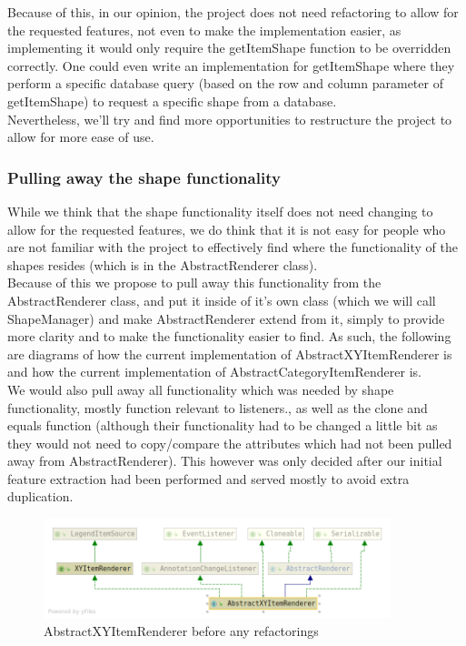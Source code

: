\documentclass{article}
\begin{document}
Because of this, in our opinion, the project does not need refactoring to allow for the requested features, not even to make the implementation easier, as implementing it would only require the getItemShape function to be overridden correctly. One could even write an implementation for getItemShape where they perform a specific database query (based on the row and column parameter of getItemShape) to request a specific shape from a database.\\

Nevertheless, we'll try and find more opportunities to restructure the project to allow for more ease of use.

\subsubsection{Pulling away the shape functionality}

While we think that the shape functionality itself does not need changing to allow for the requested features, we do think that it is not easy for people who are not familiar with the project to effectively find where the functionality of the shapes resides (which is in the AbstractRenderer class).\\

Because of this we propose to pull away this functionality from the AbstractRenderer class, and put it inside of it's own class (which we will call ShapeManager) and make AbstractRenderer extend from it, simply to provide more clarity and to make the functionality easier to find. As such, the following are diagrams of how the current implementation of AbstractXYItemRenderer is and how the current implementation of AbstractCategoryItemRenderer is.\\

We would also pull away all functionality which was needed by shape functionality, mostly function relevant to listeners., as well as the clone and equals function (although their functionality had to be changed a little bit as they would not need to copy/compare the attributes which had not been pulled away from AbstractRenderer). This however was only decided after our initial feature extraction had been performed and served mostly to avoid extra duplication.

\begin{figure}[H]
\centering
	\includegraphics[width=0.9\textwidth]{AbstractXYItemRendererBefore.png}
	\caption{AbstractXYItemRenderer before any refactorings}
\end{figure}
\end{document}
